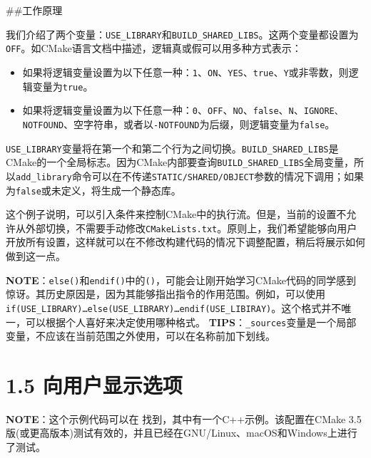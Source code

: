 \#\#工作原理

我们介绍了两个变量：\texttt{USE\_LIBRARY}和\texttt{BUILD\_SHARED\_LIBS}。这两个变量都设置为\texttt{OFF}。如CMake语言文档中描述，逻辑真或假可以用多种方式表示：

\begin{itemize}
\item 如果将逻辑变量设置为以下任意一种：\texttt{1}、\texttt{ON}、\texttt{YES}、\texttt{true}、\texttt{Y}或非零数，则逻辑变量为\texttt{true}。

\item 如果将逻辑变量设置为以下任意一种：\texttt{0}、\texttt{OFF}、\texttt{NO}、\texttt{false}、\texttt{N}、\texttt{IGNORE、NOTFOUND}、空字符串，或者以\texttt{-NOTFOUND}为后缀，则逻辑变量为\texttt{false}。

\end{itemize}

\texttt{USE\_LIBRARY}变量将在第一个和第二个行为之间切换。\texttt{BUILD\_SHARED\_LIBS}是CMake的一个全局标志。因为CMake内部要查询\texttt{BUILD\_SHARED\_LIBS}全局变量，所以\texttt{add\_library}命令可以在不传递\texttt{STATIC/SHARED/OBJECT}参数的情况下调用；如果为\texttt{false}或未定义，将生成一个静态库。

这个例子说明，可以引入条件来控制CMake中的执行流。但是，当前的设置不允许从外部切换，不需要手动修改\texttt{CMakeLists.txt}。原则上，我们希望能够向用户开放所有设置，这样就可以在不修改构建代码的情况下调整配置，稍后将展示如何做到这一点。

\begin{myInfoBox}
\textbf{NOTE}：\texttt{else()}和\texttt{endif()}中的\texttt{()}，可能会让刚开始学习CMake代码的同学感到惊讶。其历史原因是，因为其能够指出指令的作用范围。例如，可以使用\texttt{if(USE\_LIBRARY)…else(USE\_LIBRARY)…endif(USE\_LIBIRAY)}。这个格式并不唯一，可以根据个人喜好来决定使用哪种格式。 \textbf{TIPS}：\texttt{\_sources}变量是一个局部变量，不应该在当前范围之外使用，可以在名称前加下划线。
\end{myInfoBox}


\section{1.5 向用户显示选项}

\begin{myInfoBox}
\textbf{NOTE}：这个示例代码可以在  找到，其中有一个C++示例。该配置在CMake 3.5版(或更高版本)测试有效的，并且已经在GNU/Linux、macOS和Windows上进行了测试。
\end{myInfoBox}

